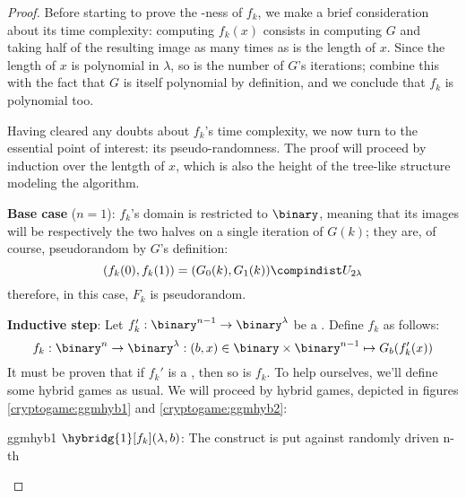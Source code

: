 \begin{proof}

    Before starting to prove the \prf-ness of $f_k$, we make a brief consideration about its time complexity: computing $f_k(x)$ consists in computing $G$ and taking half of the resulting image as many times as is the length of $x$. Since the length of $x$ is polynomial in $\lambda$, so is the number of $G$'s iterations; combine this with the fact that $G$ is itself polynomial by definition, and we conclude that $f_k$ is polynomial too.

    Having cleared any doubts about $f_k$'s time complexity, we now turn to the essential point of interest: its pseudo-randomness. The proof will proceed by induction over the lentgth of $x$, which is also the height of the tree-like structure modeling the algorithm.
    
    \textbf{Base case} ($n = 1$): $f_k$'s domain is restricted to $\binary$, meaning that its images will be respectively the two halves on a single iteration of $G(k)$; they are, of course, pseudorandom by $G$'s definition:
    \[
        (f_k(0), f_k(1)) = (G_0(k), G_1(k)) \compindist U_{2\lambda}
    \]
    therefore, in this case, $F_k$ is pseudorandom.

    \textbf{Inductive step}: Let $f'_k : \binary^{n - 1} \to \binary^\lambda$ be a \prf. Define $f_k$ as follows:
    \[
        f_k : \binary^n \to \binary^\lambda : (b, x) \in \binary \times \binary^{n - 1} \mapsto G_b(f'_k(x))
    \]
    It must be proven that if $f_k'$ is a \prf, then so is $f_k$. To help ourselves, we'll define some hybrid games as usual. We will proceed by hybrid games, depicted in figures \ref{cryptogame:ggmhyb1} and \ref{cryptogame:ggmhyb2}:

    \begin{cryptogame}
        {ggmhyb1}
        {$\hybridg{1}[f_k](\lambda, b)$: The \ggm{} construct is put against randomly driven \prg}
        {n-th}


        \cseqdelay
        \cseqbeginloop
        \cseqendloop
        \cseqdelay


\end{cryptogame}
\end{proof}
